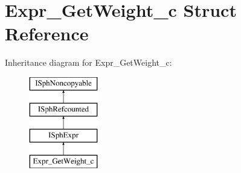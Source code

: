 \hypertarget{structExpr__GetWeight__c}{\section{Expr\-\_\-\-Get\-Weight\-\_\-c Struct Reference}
\label{structExpr__GetWeight__c}
}
Inheritance diagram for Expr\-\_\-\-Get\-Weight\-\_\-c\-:\begin{figure}[H]
\begin{center}
\leavevmode
\includegraphics[height=4.000000cm]{structExpr__GetWeight__c}
\end{center}
\end{figure}
